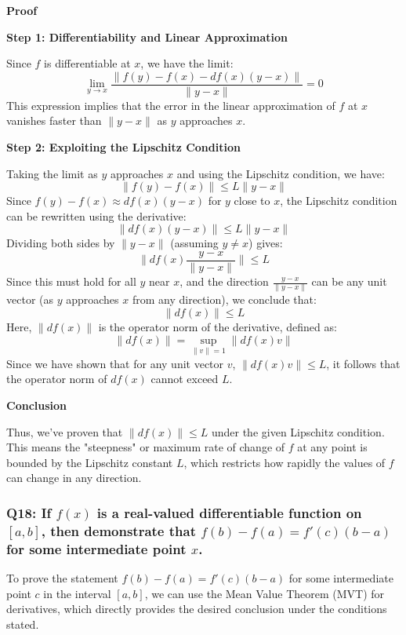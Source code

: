 \documentclass[8pt]{article}
\begin{document}
\textbf{Proof}

\textbf{Step 1: Differentiability and Linear Approximation}

Since \( f \) is differentiable at \( x \), we have the limit:
\[
\lim_{y \to x} \frac{\| f(y) - f(x) - df(x)(y - x) \|}{\| y - x \|} = 0
\]
This expression implies that the error in the linear approximation of \( f \) at \( x \) vanishes faster than \( \| y - x \| \) as \( y \) approaches \( x \).

\textbf{Step 2: Exploiting the Lipschitz Condition}

Taking the limit as \( y \) approaches \( x \) and using the Lipschitz condition, we have:
\[
\| f(y) - f(x) \| \leq L \| y - x \|
\]
Since \( f(y) - f(x) \approx df(x)(y - x) \) for \( y \) close to \( x \), the Lipschitz condition can be rewritten using the derivative:
\[
\| df(x)(y - x) \| \leq L \| y - x \|
\]
Dividing both sides by \( \| y - x \| \) (assuming \( y \neq x \)) gives:
\[
\| df(x) \frac{y - x}{\| y - x \|} \| \leq L
\]
Since this must hold for all \( y \) near \( x \), and the direction \( \frac{y - x}{\| y - x \|} \) can be any unit vector (as \( y \) approaches \( x \) from any direction), we conclude that:
\[
\| df(x) \| \leq L
\]
Here, \( \| df(x) \| \) is the operator norm of the derivative, defined as:
\[
\| df(x) \| = \sup_{\| v \| = 1} \| df(x) v \|
\]
Since we have shown that for any unit vector \( v \), \( \| df(x) v \| \leq L \), it follows that the operator norm of \( df(x) \) cannot exceed \( L \).

\textbf{Conclusion}

Thus, we've proven that \( \| df(x) \| \leq L \) under the given Lipschitz condition. This means the "steepness" or maximum rate of change of \( f \) at any point is bounded by the Lipschitz constant \( L \), which restricts how rapidly the values of \( f \) can change in any direction.

\subsubsection*{Q18: If \( f(x) \) is a real-valued differentiable function on \([a, b]\), then demonstrate that \( f(b) - f(a) = f'(c)(b - a) \) for some intermediate point \( x \).}

To prove the statement \( f(b) - f(a) = f'(c)(b - a) \) for some intermediate point \( c \) in the interval \([a, b]\), we can use the Mean Value Theorem (MVT) for derivatives, which directly provides the desired conclusion under the conditions stated.
\end{document}
